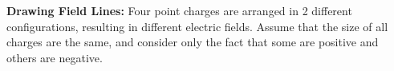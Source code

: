 \documentclass[addpoints,12pt]{exam}
\begin{document}
\begin{questions}
\question \textbf{Drawing Field Lines:} Four point charges are arranged in 2 different configurations, resulting in different electric fields. Assume that the size of all charges are the same, and consider only the fact that some are positive and others are negative.



\end{questions}
\end{document}
